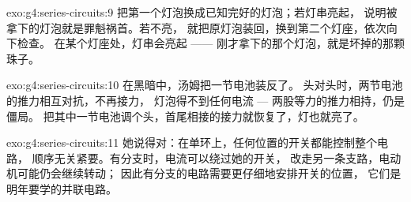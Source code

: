 \begin{solution}{exo:g4:series-circuits:9}
把第一个灯泡换成已知完好的灯泡；若灯串亮起，
说明被拿下的灯泡就是罪魁祸首。若不亮，
就把原灯泡装回，换到第二个灯座，依次向下检查。
在某个灯座处，灯串会亮起 ——
刚才拿下的那个灯泡，就是坏掉的那颗珠子。
\end{solution}

\begin{solution}{exo:g4:series-circuits:10}
在黑暗中，汤姆把一节电池装反了。
头对头时，两节电池的推力相互对抗，不再接力，
灯泡得不到任何电流 --- 两股等力的推力相持，仍是僵局。
把其中一节电池调个头，首尾相接的接力就恢复了，灯也就亮了。
\end{solution}

\begin{solution}{exo:g4:series-circuits:11}
她说得对：在单环上，任何位置的开关都能控制整个电路，
顺序无关紧要。有分支时，电流可以绕过她的开关，
改走另一条支路，电动机可能仍会继续转动；
因此有分支的电路需要更仔细地安排开关的位置，
它们是明年要学的并联电路。
\end{solution}
